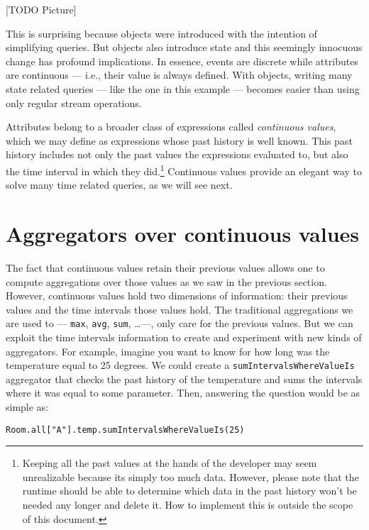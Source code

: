 \documentclass{report}
\begin{document}
[TODO Picture]

This is surprising because objects were introduced with the intention
of simplifying queries. But objects also introduce state and this
seemingly innocuous change has profound implications. In essence,
events are discrete while attributes are continuous --- i.e., their
value is always defined. With objects, writing many state related
queries --- like the one in this example --- becomes easier than using
only regular stream operations.

Attributes belong to a broader class of expressions called
\emph{continuous values}, which we may define as expressions whose
past history is well known. This past history includes not only the
past values the expressions evaluated to, but also the time interval
in which they did.\footnote{Keeping all the past values at the hands
  of the developer may seem unrealizable because its simply too much
  data. However, please note that the runtime should be able to
  determine which data in the past history won't be needed any longer
  and delete it. How to implement this is outside the scope of this
  document.} Continuous values provide an elegant way to solve many
time related queries, as we will see next.

\section{Aggregators over continuous values}

The fact that continuous values retain their previous values allows
one to compute aggregations over those values as we saw in the
previous section. However, continuous values hold two dimensions of
information: their previous values and the time intervals those values
hold. The traditional aggregations we are used to --- \verb=max=,
\verb=avg=, \verb=sum=, \ldots ---, only care for the previous
values. But we can exploit the time intervals information to create
and experiment with new kinds of aggregators. For example, imagine you
want to know for how long was the temperature equal to 25 degrees. We
could create a \verb=sumIntervalsWhereValueIs= aggregator that checks
the past history of the temperature and sums the intervals where it
was equal to some parameter. Then, answering the question would be as
simple as:

\begin{verbatim}
Room.all["A"].temp.sumIntervalsWhereValueIs(25)
\end{verbatim}
\end{document}
